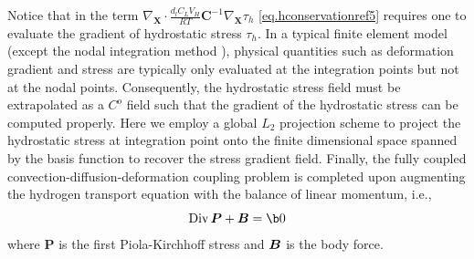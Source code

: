 \documentclass[10pt]{elsarticle}
\newcommand{\mbs}[1]{\boldsymbol{#1}}
\def\bs{{\mbs{s}}} \def\bt{{\mbs{t}}} \def\bu{{\mbs{u}}}
\DeclareMathOperator{\Div}{Div}
\def\bs{\boldsymbol}
\newcommand{\tensor}[1]{\ensuremath{\boldsymbol{#1}}}
\begin{document}
Notice that in the term 
$\nabla_{\bs{X}}  \cdot \frac{d_{l} C_{L}V_{H}}{RT} \bs{C}^{-1} \nabla_{\bs{X}}\tau_{h}$ \eqref{eq.hconservationref5}
requires one to evaluate the gradient of hydrostatic stress $\tau_{h}$. In a typical finite element model
(except the nodal integration method \cite{Krysl:2008}), physical quantities such as deformation gradient
 and stress are typically only evaluated at the integration points but not at the nodal points. 
 Consequently, the hydrostatic stress field must be extrapolated as a $C^{o}$ field  such that the gradient of the hydrostatic
 stress can be computed properly. Here we employ a global $L_{2}$ projection scheme to 
project the hydrostatic stress at integration point onto the finite dimensional space 
spanned by the basis function to recover the stress gradient field.  
Finally, the fully coupled convection-diffusion-deformation coupling problem is completed upon augmenting the hydrogen transport equation with the balance of linear momentum, i.e.,
\begin{equation}
\label{eq:balanceLinearMomentum} \Div \tensor{P} +  \bB = \b0  
\end{equation}
where $\tensor{P}$ is the first Piola-Kirchhoff stress and $\bB$ is the body force. 
%
\end{document}
